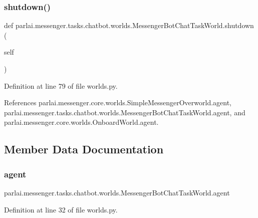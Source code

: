 \subsubsection{\texorpdfstring{shutdown()}{shutdown()}}
{\footnotesize\ttfamily def parlai.\+messenger.\+tasks.\+chatbot.\+worlds.\+Messenger\+Bot\+Chat\+Task\+World.\+shutdown (\begin{DoxyParamCaption}\item[{}]{self }\end{DoxyParamCaption})}



Definition at line 79 of file worlds.\+py.



References parlai.\+messenger.\+core.\+worlds.\+Simple\+Messenger\+Overworld.\+agent, parlai.\+messenger.\+tasks.\+chatbot.\+worlds.\+Messenger\+Bot\+Chat\+Task\+World.\+agent, and parlai.\+messenger.\+core.\+worlds.\+Onboard\+World.\+agent.



\subsection{Member Data Documentation}
\mbox{\label{classparlai_1_1messenger_1_1tasks_1_1chatbot_1_1worlds_1_1MessengerBotChatTaskWorld_ae6cb9315b1f72666d357796ab21345d9}} 
\subsubsection{\texorpdfstring{agent}{agent}}
{\footnotesize\ttfamily parlai.\+messenger.\+tasks.\+chatbot.\+worlds.\+Messenger\+Bot\+Chat\+Task\+World.\+agent}



Definition at line 32 of file worlds.\+py.



